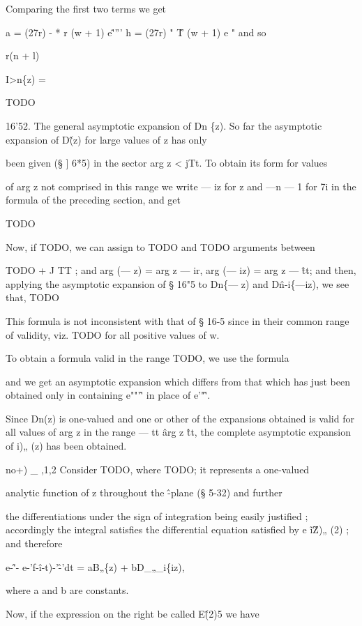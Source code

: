 Comparing the first two terms we get

a = (27r) - * r (w + 1) e\^'''' h = (27r) " \^ T (w + 1) e " and so

r(n + l)

I>n\{z) =

TODO

16'52. The general asymptotic expansion of Dn \{z). So far the
asymptotic expansion of D\^ (z) for large values of z has only

been given (§ ] 6*5) in the sector arg z < jTt. To obtain its form for
values

of arg z not comprised in this range we write — iz for z and —n — 1
for 7i in the formula of the preceding section, and get

TODO

Now, if TODO, we can assign to TODO and TODO arguments between

TODO + J TT ; and arg (— z) = arg z — ir, arg (— iz) = arg z — \^tt;
and then, applying the asymptotic expansion of § 16"5 to Dn\{— z) and
D\^n-i\{—iz), we see that, TODO

%
%

This formula is not inconsistent with that of § 16-5 since in their
common range of validity, viz. TODO for all positive values of w.

To obtain a formula valid in the range TODO, we use the formula

and we get an asymptotic expansion which differs from that which has
just been obtained only in containing e""'\^' in place of e'"\^'.

Since Dn(z) is one-valued and one or other of the expansions obtained
is valid for all values of arg z in the range — tt \^ arg z \^tt, the
complete asymptotic expansion of i)„ (z) has been obtained.


no+) \_ ,1,2 Consider TODO, where TODO; it represents a one-valued

analytic function of z throughout the \^-plane (§ 5-32) and further

the differentiations under the sign of integration being easily
justified ; accordingly the integral satisfies the differential
equation satisfied by e \~ i\^ Z)„ (2) ; and therefore

e-\^'- e-'f-\^i-t)-'\^-'dt = aB„\{z) + bD\_„\_i\{iz),

where a and b are constants.

Now, if the expression on the right be called E\^ (2)5 we have

